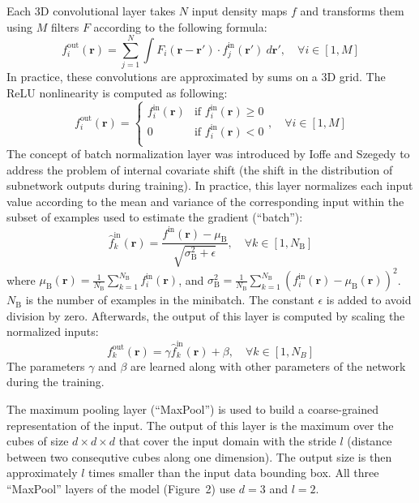 \documentclass{bioinfo}
\begin{document}
Each 3D convolutional layer takes $N$ input density maps $f$ and
transforms them using $M$ filters $F$ according to the following
formula:
$$
f^\text{out}_i (\mathbf{r}) = \sum^{N}_{j=1} \int F_i (\mathbf{r} - \mathbf{r'}) \cdot f^\text{in}_j(\mathbf{r'}) ~d\mathbf{r'}, \quad\forall i \in [1,M]
$$
In practice, these convolutions are approximated by sums on a 3D grid.
The ReLU nonlinearity is computed as following:
$$
f^\text{out}_i (\mathbf{r}) = \begin{cases}
               f^\text{in}_i(\mathbf{r}) &\text{if } f^\text{in}_i(\mathbf{r})\geq 0\\
               0                         &\text{if } f^\text{in}_i(\mathbf{r})<0\\
            \end{cases}, \quad\forall i \in [1,M]
$$
The concept of batch normalization layer was introduced by Ioffe and
Szegedy \citep{ioffe2015batch} to address the problem of internal
covariate shift (the shift in the distribution of subnetwork outputs
during training). In practice, this layer normalizes each input value
according to the mean and variance of the corresponding input within
the subset of examples used to estimate the gradient (``batch''):
$$
\hat{f}^\text{in}_k(\mathbf{r}) = \frac{f^\text{in}(\mathbf{r}) - \mu_\text{B}}{\sqrt{\sigma^{2}_\text{B} + \epsilon}}, \quad\forall k \in [1,N_\text{B}]
$$
where $\mu_\text{B}(\mathbf{r})
= \frac{1}{N_\text{B}} \sum_{k=1}^{N_\text{B}}
f^\text{in}_i(\mathbf{r})$, and $\sigma^{2}_\text{B}
= \frac{1}{N_\text{B}} \sum_{k=1}^{N_\text{B}} \left(
f^\text{in}_i(\mathbf{r}) - \mu_\text{B}
(\mathbf{r}) \right)^2$. $N_\text{B}$ is the number of examples in the
minibatch. The constant $\epsilon$ is added to avoid division by
zero. Afterwards, the output of this layer is computed by scaling the
normalized inputs:
$$
f^\text{out}_k(\mathbf{r}) = \gamma \hat{f}^\text{in}_k(\mathbf{r}) + \beta, \quad\forall k \in [1,N_B]
$$
The parameters $\gamma$ and $\beta$ are learned along with other
parameters of the network during the training.

The maximum pooling layer (``MaxPool'') is used to build a
coarse-grained representation of the input. The output of this layer
is the maximum over the cubes of size $d \times d \times d$ that cover
the input domain with the stride $l$ (distance between two consequtive
cubes along one dimension).  The output size is then approximately $l$
times smaller than the input data bounding box.  All three ``MaxPool''
layers of the model (Figure~2\vphantom{\ref{Fig:CNNModel}}) use $d=3$ and $l=2$.
\end{document}
